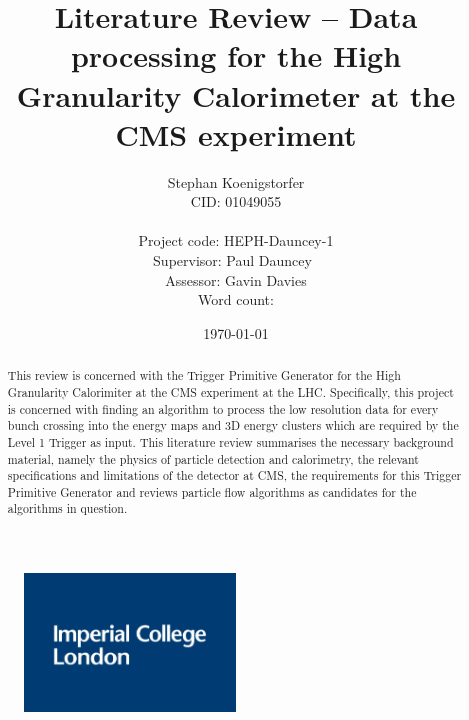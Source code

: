 \documentclass[12 pt]{article}
\title{Literature Review – Data processing for the High Granularity Calorimeter at the CMS experiment}
\date{\today}
\author{Stephan Koenigstorfer \\ CID: 01049055 \\ \\ Project code: HEPH-Dauncey-1 \\ Supervisor: Paul Dauncey \\ Assessor: Gavin Davies \\ Word count:}
\begin{document}
	
	\maketitle

	\begin{figure}[H]
		\centering
		\includegraphics[width=0.5\textwidth]{imperial_logo.png}
	\end{figure}
	
	\newpage
	\tableofcontents

	\newpage


	\begin{abstract}
		This review is concerned with the Trigger Primitive Generator for the High Granularity Calorimiter at the CMS experiment at the LHC. Specifically, this project is concerned with finding an algorithm to process the low resolution data for every bunch crossing into the energy maps and 3D energy clusters which are required by the Level 1 Trigger as input. This literature review summarises the necessary background material, namely the physics of particle detection and calorimetry, the relevant specifications and limitations of the detector at CMS, the requirements for this Trigger Primitive Generator and reviews particle flow algorithms as candidates for the algorithms in question. 
	\end{abstract}
\end{document}
